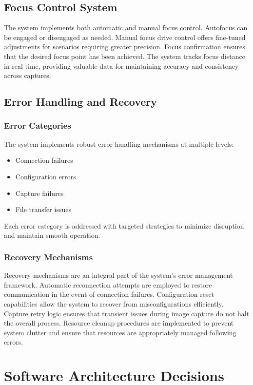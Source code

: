 \subsection{Focus Control System}

The system implements both automatic and manual focus control. Autofocus can be engaged or disengaged as needed. Manual focus drive control offers fine-tuned adjustments for scenarios requiring greater precision. Focus confirmation ensures that the desired focus point has been achieved. The system tracks focus distance in real-time, providing valuable data for maintaining accuracy and consistency across captures.

\subsection{Error Handling and Recovery}

\subsubsection{Error Categories}
The system implements robust error handling mechanisms at multiple levels:

\begin{itemize}
    \item Connection failures
    \item Configuration errors
    \item Capture failures
    \item File transfer issues
\end{itemize}

Each error category is addressed with targeted strategies to minimize disruption and maintain smooth operation.

\subsubsection{Recovery Mechanisms}
Recovery mechanisms are an integral part of the system’s error management framework. Automatic reconnection attempts are employed to restore communication in the event of connection failures. Configuration reset capabilities allow the system to recover from misconfigurations efficiently. Capture retry logic ensures that transient issues during image capture do not halt the overall process. Resource cleanup procedures are implemented to prevent system clutter and ensure that resources are appropriately managed following errors.

\section{Software Architecture Decisions}

